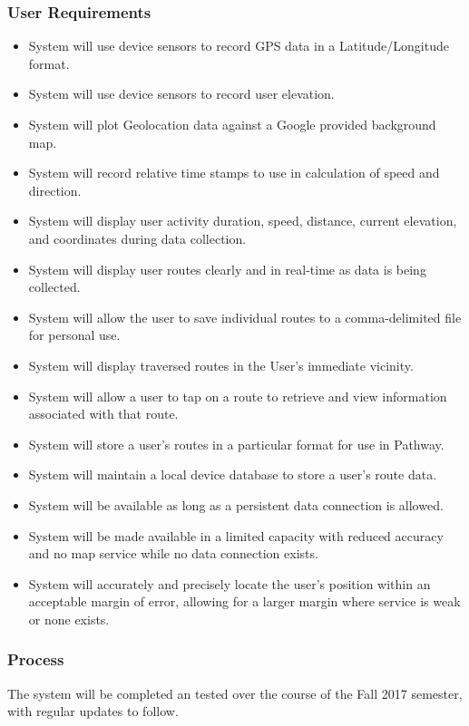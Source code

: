 ﻿\documentclass{article}
\begin{document}
\subsubsection{User Requirements}
\begin{itemize}
    \item System will use device sensors to record GPS data in a Latitude/Longitude format.
    \item System will use device sensors to record user elevation.
    \item System will plot Geolocation data against a Google provided background map.
    \item System will record relative time stamps to use in calculation of speed and direction.
    \item System will display user activity duration, speed, distance, current elevation, and coordinates during data collection.
    \item System will display user routes clearly and in real-time as data is being collected.
    \item System will allow the user to save individual routes to a comma-delimited file for personal use.
    \item System will display traversed routes in the User's immediate vicinity.
    \item System will allow a user to tap on a route to retrieve and view information associated with that route.
    \item System will store a user’s routes in a particular format for use in Pathway.
    \item System will maintain a local device database to store a user's route data.
    \item System will be available as long as a persistent data connection is allowed.
    \item System will be made available in a limited capacity with reduced accuracy and no map service while no data connection exists.
    \item System will accurately and precisely locate the user’s position within an acceptable margin of error, allowing for a larger margin where service is weak or none exists.
\end{itemize}

\subsubsection{Process}
The system will be completed an tested over the course of the Fall 2017 semester, with regular updates to follow.
\end{document}
